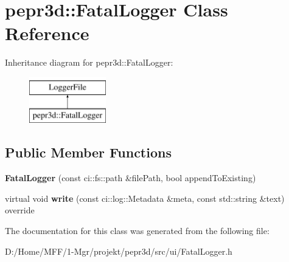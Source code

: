 \hypertarget{classpepr3d_1_1_fatal_logger}{}\section{pepr3d\+::Fatal\+Logger Class Reference}
\label{classpepr3d_1_1_fatal_logger}
Inheritance diagram for pepr3d\+::Fatal\+Logger\+:\begin{figure}[H]
\begin{center}
\leavevmode
\includegraphics[height=2.000000cm]{classpepr3d_1_1_fatal_logger}
\end{center}
\end{figure}
\subsection*{Public Member Functions}
\begin{DoxyCompactItemize}
\item 
\mbox{\label{classpepr3d_1_1_fatal_logger_a3acfbb566a2789d79e525ee36540987c}} 
{\bfseries Fatal\+Logger} (const ci\+::fs\+::path \&file\+Path, bool append\+To\+Existing)
\item 
\mbox{\label{classpepr3d_1_1_fatal_logger_a0d923495ed7ab58734f89e40caf7f321}} 
virtual void {\bfseries write} (const ci\+::log\+::\+Metadata \&meta, const std\+::string \&text) override
\end{DoxyCompactItemize}


The documentation for this class was generated from the following file\+:\begin{DoxyCompactItemize}
\item 
D\+:/\+Home/\+M\+F\+F/1-\/\+Mgr/projekt/pepr3d/src/ui/Fatal\+Logger.\+h\end{DoxyCompactItemize}
